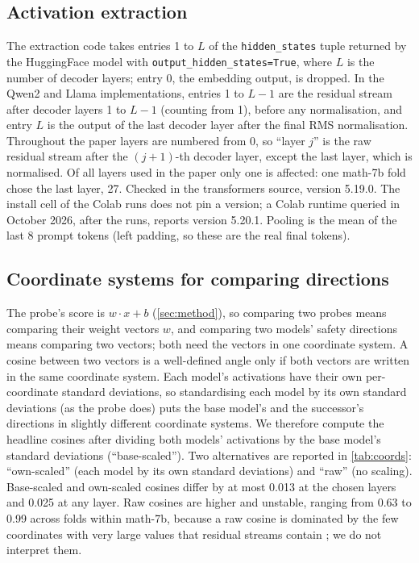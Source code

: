 \documentclass[10pt]{article}
\begin{document}
\subsection{Activation extraction}
\label{app:activations}
The extraction code takes entries 1 to $L$ of the \texttt{hidden\_states} tuple returned by the HuggingFace model with \texttt{output\_hidden\_states=True}, where $L$ is the number of decoder layers; entry 0, the embedding output, is dropped. In the Qwen2 and Llama implementations, entries 1 to $L-1$ are the residual stream after decoder layers 1 to $L-1$ (counting from 1), before any normalisation, and entry $L$ is the output of the last decoder layer after the final RMS normalisation. Throughout the paper layers are numbered from 0, so ``layer $j$'' is the raw residual stream after the $(j+1)$-th decoder layer, except the last layer, which is normalised. Of all layers used in the paper only one is affected: one math-7b fold chose the last layer, 27. Checked in the transformers source, version 5.19.0. The install cell of the Colab runs does not pin a version; a Colab runtime queried in October 2026, after the runs, reports version 5.20.1. Pooling is the mean of the last 8 prompt tokens (left padding, so these are the real final tokens).

\subsection{Coordinate systems for comparing directions}
\label{app:coordinates}
The probe's score is $w \cdot x + b$ (\cref{sec:method}), so comparing two probes means comparing their weight vectors $w$, and comparing two models' safety directions means comparing two vectors; both need the vectors in one coordinate system. A cosine between two vectors is a well-defined angle only if both vectors are written in the same coordinate system. Each model's activations have their own per-coordinate standard deviations, so standardising each model by its own standard deviations (as the probe does) puts the base model's and the successor's directions in slightly different coordinate systems. We therefore compute the headline cosines after dividing both models' activations by the base model's standard deviations (``base-scaled''). Two alternatives are reported in \cref{tab:coords}: ``own-scaled'' (each model by its own standard deviations) and ``raw'' (no scaling). Base-scaled and own-scaled cosines differ by at most 0.013 at the chosen layers and 0.025 at any layer. Raw cosines are higher and unstable, ranging from 0.63 to 0.99 across folds within math-7b, because a raw cosine is dominated by the few coordinates with very large values that residual streams contain \citep{sun2024}; we do not interpret them.
\end{document}
